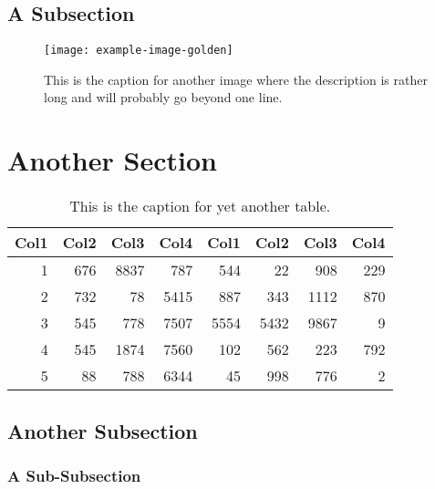 \subsection{A Subsection}
    \lipsum[6-8]
    \begin{figure}
        \centering
        \texttt{[image: example-image-golden]}
        \caption{This is the caption for another image where the description is rather long and will probably go beyond one line.}
    \end{figure}

\section{Another Section}
    \lipsum[1-2]
    \begin{table}
        \centering
        \begin{tabular}{r r r r r r r r}
             Col1 & Col2 & Col3 & Col4 & Col1 & Col2 & Col3 & Col4 \\
             \hline
             1    & 676  & 8837 & 787  & 544  & 22   & 908  & 229  \\
             2    & 732  & 78   & 5415 & 887  & 343  & 1112 & 870  \\
             3    & 545  & 778  & 7507 & 5554 & 5432 & 9867 & 9    \\
             4    & 545  & 1874 & 7560 & 102  & 562  & 223  & 792  \\
             5    & 88   & 788  & 6344 & 45   & 998  & 776  & 2    \\
             \hline
        \end{tabular}
        \caption{This is the caption for yet another table.}
    \end{table}

\subsection{Another Subsection}
    \lipsum[3-5]

\subsubsection{A Sub-Subsection}
    \lipsum[6-8]
